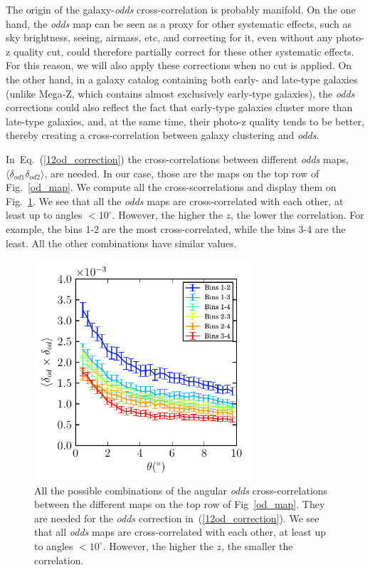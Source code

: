 The origin of the galaxy-\textit{odds} cross-correlation is probably manifold. On the one hand,  
the \textit{odds} map can be seen as a proxy for other systematic effects, such as sky brightness, seeing, airmass, etc, and correcting for it, even without any photo-z quality cut, could therefore partially correct for these other systematic effects.
For this reason, we will also apply these corrections when no cut is applied.
On the other hand, in a galaxy catalog containing both early- and late-type galaxies (unlike Mega-Z, which contains almost exclusively early-type galaxies), the \textit{odds} corrections could also reflect the fact that early-type galaxies cluster more than late-type galaxies, and, at the same time, their photo-z quality tends to be better, thereby creating a cross-correlation between galaxy clustering and \textit{odds}. 

In~Eq.~(\ref{12od_correction}) the cross-correlations between different \textit{odds} maps, $\langle \delta_{od1} \delta_{od2} \rangle$, are needed. In our case, those are the maps on the top row of Fig.~{\ref{od_map}}. We compute all the cross-scorrelations and display them on Fig.~\ref{cross_od}. We see that all the \textit{odds} maps are cross-correlated with each other, at least up to angles $<10^\circ$. However, the higher the $z$, the lower the correlation. For example, the bins 1-2 are the most cross-correlated, while the bins 3-4 are the least. All the other combinations have similar values.  
\begin{figure}
\centering
\includegraphics[width=80mm]{./plots/cross_od_plot.pdf}
\caption{All the possible combinations of the angular \textit{odds} cross-correlations between the different maps on the  top row of Fig~\ref{od_map}. They are needed for the \textit{odds} correction in~(\ref{12od_correction}). We see that all \textit{odds} maps are cross-correlated with each other, at least up to angles $<10^\circ$. However, the higher the $z$, the smaller the correlation.}
\label{cross_od}
\end{figure}

